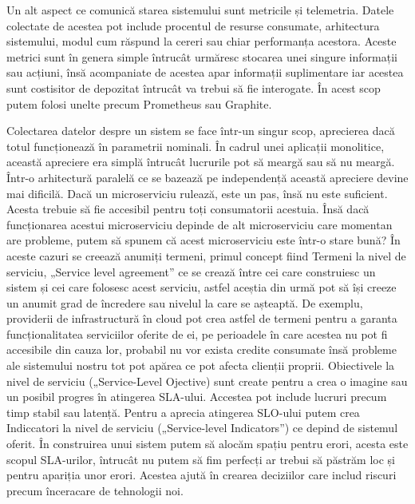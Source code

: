 Un alt aspect ce comunică starea sistemului sunt metricile și telemetria. Datele colectate de 
acestea pot include procentul de resurse consumate, arhitectura sistemului, modul cum răspund la cereri 
sau chiar performanța acestora. Aceste metrici sunt în genera simple întrucât urmăresc 
stocarea unei singure informații sau acțiuni, însă acompaniate de acestea apar informații 
suplimentare iar acestea sunt costisitor de depozitat întrucât va trebui să fie interogate.
În acest scop putem folosi unelte precum Prometheus sau Graphite.

Colectarea datelor despre un sistem se face într-un singur scop, aprecierea dacă totul
funcționează în parametrii nominali. În cadrul unei aplicații monolitice, această apreciere 
era simplă întrucât lucrurile pot să meargă sau să nu meargă. Într-o arhitectură paralelă
ce se bazează pe independență această apreciere devine mai dificilă. Dacă un microserviciu rulează,
este un pas, însă nu este suficient. Acesta trebuie să fie accesibil pentru toți consumatorii 
acestuia. Însă dacă funcționarea acestui microserviciu depinde de alt microserviciu care 
momentan are probleme, putem să spunem că acest microserviciu este într-o stare bună?
În aceste cazuri se creează anumiți termeni, primul concept fiind Termeni la nivel de serviciu,
„Service level agreement” ce se crează între cei care construiesc un sistem și cei care folosesc
acest serviciu, astfel aceștia din urmă pot să își creeze un anumit grad de încredere sau
nivelul la care se așteaptă. De exemplu, providerii de infrastructură în cloud pot 
crea astfel de termeni pentru a garanta funcționalitatea serviciilor oferite de ei, pe
perioadele în care acestea nu pot fi accesibile din cauza lor, probabil nu vor exista credite 
consumate însă probleme ale sistemului nostru tot pot apărea ce pot afecta clienții proprii.
Obiectivele la nivel de serviciu („Service-Level Ojective) sunt create pentru a crea o imagine sau un posibil progres
în atingerea SLA-ului. Accestea pot include lucruri precum timp stabil sau latență. Pentru 
a aprecia atingerea SLO-ului putem crea Indiccatori la nivel de serviciu („Service-level Indicators”)
ce depind de sistemul oferit. În construirea unui sistem putem să alocăm spațiu pentru erori, 
acesta este scopul SLA-urilor, întrucât nu putem să fim perfecți ar trebui să păstrăm
loc și pentru apariția unor erori. Acestea ajută în crearea deciziilor care includ riscuri 
precum înceracare de tehnologii noi.

